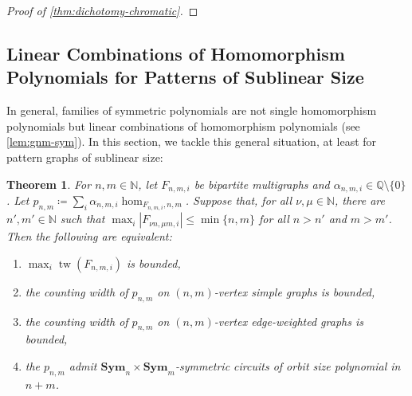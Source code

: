 \documentclass[11pt, DIV=15]{scrarticle}
\theoremstyle{definition}
\theoremstyle{plain}
\newtheorem{theorem}[definition]{Theorem}
\theoremstyle{remark}
\DeclareMathOperator{\tw}{tw}
\newcommand{\Sym}{\mathbf{Sym}}
\begin{document}
\begin{proof}[Proof of \cref{thm:dichotomy-chromatic}]
%		
	\end{proof}
	
	\subsection{Linear Combinations of Homomorphism Polynomials for Patterns of Sublinear Size}
	
	In general, families of symmetric polynomials are not single homomorphism polynomials but linear combinations of homomorphism polynomials (see \cref{lem:gnm-sym}).
	In this section, we tackle this general situation, at least for pattern graphs of sublinear size:
	
	\begin{theorem}
		\label{thm:lincomb}
		For $n,m \in \mathbb{N}$, 
		let $F_{n,m,i}$ be bipartite multigraphs and $\alpha_{n,m,i} \in \mathbb{Q} \setminus \{0\}$.
		Let $p_{n,m} \coloneqq \sum_i \alpha_{n,m,i} \hom_{F_{n,m,i}, n,m}$.
		Suppose that, for all $\nu, \mu \in \mathbb{N}$,
		there are $n', m' \in \mathbb{N}$ 
		such that $\max_i |F_{\nu n, \mu m,i}| \leq \min \{n,m\}$ for all $n > n'$ and $m > m'$.		
		Then the following are equivalent:
		\begin{enumerate}
			\item\label{it:lincomb1} $\max_i \tw(F_{n,m,i})$ is bounded,
			\item\label{it:lincomb2} the counting width of $p_{n,m}$ on $(n,m)$-vertex simple graphs is bounded,
			\item the counting width of $p_{n,m}$ on $(n,m)$-vertex edge-weighted graphs is bounded,
			\item the $p_{n,m}$ admit $\Sym_n\times \Sym_m$-symmetric circuits of orbit size polynomial in $n+m$.
		\end{enumerate}
	\end{theorem}
	
\end{document}
